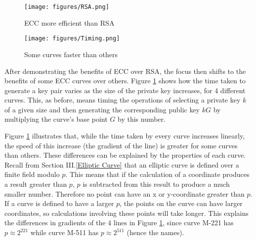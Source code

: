 \documentclass[12pt,a4paper]{article}
\begin{document}


\begin{figure}[!htb]
    \begin{minipage}{0.5\textwidth}
        \centering
        \texttt{[image: figures/RSA.png]}
        \caption{ECC more efficient than RSA}
        \label{fig:rsa}
    \end{minipage}\hfill
    \begin{minipage}{0.5\textwidth}
        \centering
        \texttt{[image: figures/Timing.png]}
        \caption{Some curves faster than others}
        \label{fig:curves}
    \end{minipage}
\end{figure}

\vspace{5mm}

After demonstrating the benefits of ECC over RSA, the focus then shifts to the benefits of some ECC curves over others. 
Figure \ref{fig:curves} shows how the time taken to generate a key pair varies as the size of the private key increases, for 4 different curves. 
This, as before, means timing the operations of selecting a private key $k$ of a given size and then generating the corresponding public key $kG$ by 
multiplying the curve's base point $G$ by this number. 

Figure \ref{fig:curves} illustrates that, while the time taken by every curve increases linearly, 
the speed of this increase (the gradient of the line) is greater for some curves than others. 
These differences can be explained by the properties of each curve. 
Recall from Section III.\ref{Elliptic Curve} that an elliptic curve is defined over a finite field modulo $p$. 
This means that if the calculation of a coordinate produces a result greater than $p$, $p$ is subtracted from this result to produce a much smaller number. 
Therefore no point can have an x or y-coordinate greater than $p$. 
If a curve is defined to have a larger $p$, the points on the curve can have larger coordinates, 
so calculations involving these points will take longer. 
This explains the differences in gradients of the 4 lines in Figure \ref{fig:curves}, 
since curve M-221 has $p \approx 2^{221}$ while curve M-511 has $p \approx 2^{511}$ (hence the names). 
\end{document}
